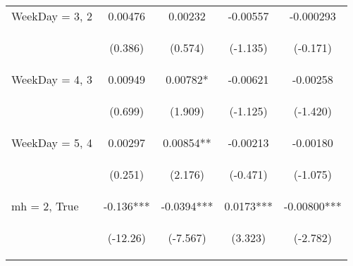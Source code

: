 \documentclass[]{article}
\begin{document}
\begin{center}
\begin{tabular}{lcccc}
WeekDay = 3, 2 & 0.00476 & 0.00232 & -0.00557 & -0.000293 \\
\vspace{4pt} & \begin{footnotesize}(0.386)\end{footnotesize} & \begin{footnotesize}(0.574)\end{footnotesize} & \begin{footnotesize}(-1.135)\end{footnotesize} & \begin{footnotesize}(-0.171)\end{footnotesize} \\
WeekDay = 4, 3 & 0.00949 & 0.00782* & -0.00621 & -0.00258 \\
\vspace{4pt} & \begin{footnotesize}(0.699)\end{footnotesize} & \begin{footnotesize}(1.909)\end{footnotesize} & \begin{footnotesize}(-1.125)\end{footnotesize} & \begin{footnotesize}(-1.420)\end{footnotesize} \\
WeekDay = 5, 4 & 0.00297 & 0.00854** & -0.00213 & -0.00180 \\
\vspace{4pt} & \begin{footnotesize}(0.251)\end{footnotesize} & \begin{footnotesize}(2.176)\end{footnotesize} & \begin{footnotesize}(-0.471)\end{footnotesize} & \begin{footnotesize}(-1.075)\end{footnotesize} \\
mh = 2, True & -0.136*** & -0.0394*** & 0.0173*** & -0.00800*** \\
\vspace{4pt} & \begin{footnotesize}(-12.26)\end{footnotesize} & \begin{footnotesize}(-7.567)\end{footnotesize} & \begin{footnotesize}(3.323)\end{footnotesize} & \begin{footnotesize}(-2.782)\end{footnotesize} \\

\end{tabular}
\end{center}
\end{document}
